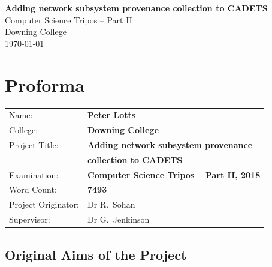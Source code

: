 \documentclass[a4paper,12pt,twoside,openright]{report}
\begin{document}
	
	
	
	\pagestyle{empty}
	
	
	\vspace*{60mm}
	\begin{center}
		\Huge
		\textbf{Adding network subsystem provenance collection to CADETS} \\[5mm]
		Computer Science Tripos -- Part II \\[5mm]
		Downing College \\[5mm]
		\today  %
	\end{center}
	
	
	\pagestyle{plain}
	
	\chapter*{Proforma}
	
	{\large
		\begin{tabular}{ll}
			Name:               & \bf Peter Lotts                       \\
			College:            & \bf Downing College                     \\
			Project Title:      & \bf Adding network subsystem provenance \\
								& \bf collection to CADETS \\
			Examination:        & \bf Computer Science Tripos -- Part II, 2018  \\
			Word Count:         & \bf 7493\footnotemark[1]  \\
			Project Originator: & Dr R.~Sohan                    \\
			Supervisor:         & Dr G.~Jenkinson                    \\ 
		\end{tabular}
	}
	
	
	\section*{Original Aims of the Project}
	
\end{document}
